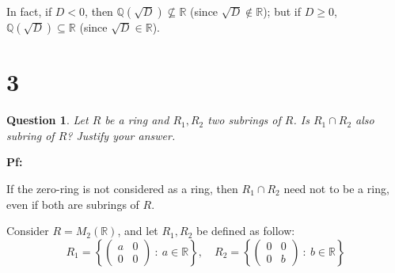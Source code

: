 \documentclass{article}
\newtheorem{question}{Question}
\begin{document}
In fact, if $D<0$, then $\mathbb{Q}(\sqrt{D})\not\subseteq \mathbb{R}$ (since $\sqrt{D} \notin \mathbb{R}$); but if $D \geq 0$, $\mathbb{Q}(\sqrt{D}) \subseteq \mathbb{R}$ (since $\sqrt{D}\in \mathbb{R}$).

\break

\section*{3}
\begin{question}
    Let $R$ be a ring and $R_1,R_2$ two subrings of $R$. Is $R_1\cap R_2$ also subring of $R$? Justify your answer.
\end{question}

\textbf{Pf:}

If the zero-ring is not considered as a ring, then $R_1\cap R_2$ need not to be a ring, even if both are subrings of $R$.

Consider $R = M_2(\mathbb{R})$, and let $R_1,R_2$ be defined as follow:
$$R_1 = \left\{\begin{pmatrix}
    a&0\\0&0
\end{pmatrix}\ :\ a\in\mathbb{R}\right\},\quad R_2=\left\{\begin{pmatrix}
    0&0\\0&b
\end{pmatrix}\ :\ b\in\mathbb{R}\right\}$$
\end{document}
